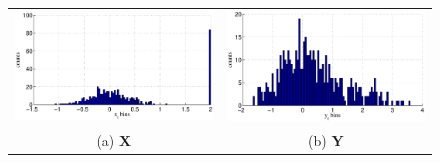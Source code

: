 \begin{figure}[ht]
\begin{tabular}{cc}
\includegraphics[scale=0.5]{NoisyMultiResponseExample_Xhist.eps} & \includegraphics[scale=0.5]{NoisyMultiResponseExample_Yhist.eps} \\
(a) $\mathbf{X}$ & (b) $\mathbf{Y}$ \\

\end{tabular}
\end{figure}
